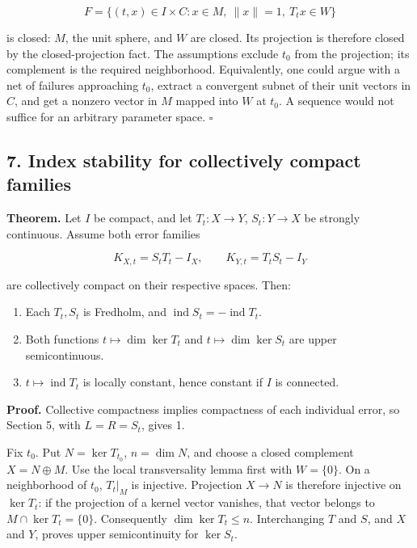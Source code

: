 \documentclass[
  11pt,
]{article}
\providecommand{\tightlist}{%
  \setlength{\itemsep}{0pt}\setlength{\parskip}{0pt}}
\begin{document}
\[
F=\{(t,x)\in I\times C:x\in M,\ \|x\|=1,\ T_tx\in W\}
\]

is closed: \(M\), the unit sphere, and \(W\) are closed. Its projection
is therefore closed by the closed-projection fact. The assumptions
exclude \(t_0\) from the projection; its complement is the required
neighborhood. Equivalently, one could argue with a net of failures
approaching \(t_0\), extract a convergent subnet of their unit vectors
in \(C\), and get a nonzero vector in \(M\) mapped into \(W\) at
\(t_0\). A sequence would not suffice for an arbitrary parameter space.
\(\square\)

\subsection{7. Index stability for collectively compact
families}\label{index-stability-for-collectively-compact-families}

\textbf{Theorem.} Let \(I\) be compact, and let \(T_t:X\to Y\),
\(S_t:Y\to X\) be strongly continuous. Assume both error families

\[
K_{X,t}=S_tT_t-I_X,\qquad K_{Y,t}=T_tS_t-I_Y                   \tag{F18}
\]

are collectively compact on their respective spaces. Then:

\begin{enumerate}
\def\labelenumi{\arabic{enumi}.}
\tightlist
\item
  Each \(T_t,S_t\) is Fredholm, and
  \(\operatorname{ind}S_t=-\operatorname{ind}T_t\).
\item
  Both functions \(t\mapsto\dim\ker T_t\) and \(t\mapsto\dim\ker S_t\)
  are upper semicontinuous.
\item
  \(t\mapsto\operatorname{ind}T_t\) is locally constant, hence constant
  if \(I\) is connected.
\end{enumerate}

\textbf{Proof.} Collective compactness implies compactness of each
individual error, so Section 5, with \(L=R=S_t\), gives 1.

Fix \(t_0\). Put \(N=\ker T_{t_0}\), \(n=\dim N\), and choose a closed
complement \(X=N\oplus M\). Use the local transversality lemma first
with \(W=\{0\}\). On a neighborhood of \(t_0\), \(T_t|_M\) is injective.
Projection \(X\to N\) is therefore injective on \(\ker T_t\): if the
projection of a kernel vector vanishes, that vector belongs to
\(M\cap\ker T_t=\{0\}\). Consequently \(\dim\ker T_t\leq n\).
Interchanging \(T\) and \(S\), and \(X\) and \(Y\), proves upper
semicontinuity for \(\ker S_t\).
\end{document}
